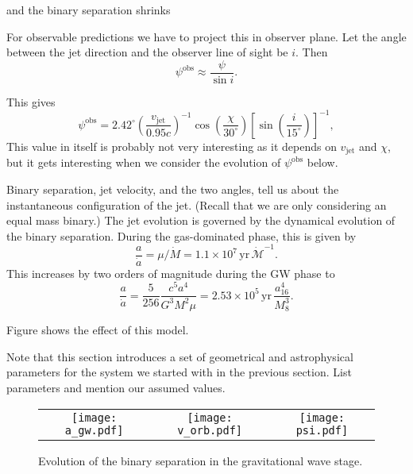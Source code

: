 and
the binary separation shrinks 

For observable predictions we have to project this in observer plane.
Let the angle between the jet direction and the observer line of sight
be $i$.  Then
\begin{equation}
  \psi^\mathrm{obs}\approx\frac{\psi}{\sin i}.
\end{equation}


This gives
\begin{equation}
  \psi^\mathrm{obs}=2.42^\circ \left(\frac{v_\mathrm{jet}}{0.95 c}\right)^{-1}\cos\left(\frac{\chi}{30^{\circ}}\right)\left[\sin\left(\frac{i}{15^{\circ}}\right)\right]^{-1},
\end{equation}
This value in itself is probably not very interesting as it depends on
$v_\mathrm{jet}$ and $\chi$, but it gets interesting when we consider
the evolution of $\psi^\mathrm{obs}$ below.

Binary separation, jet velocity, and the two angles, tell us about the
instantaneous configuration of the jet.  (Recall that we are only
considering an equal mass binary.)  The jet evolution is governed by
the dynamical evolution of the binary separation.  During the
gas-dominated phase, this is given by
\begin{equation}
\frac{a}{\dot a} = \mu/\dot M = 1.1\times 10^7\, \mathrm{yr}\,\dot{\mathcal{M}}^{-1}.   
\end{equation}
This increases by two orders of magnitude during the GW phase to
\begin{equation}
\frac{a}{\dot a} = \frac{5}{256}\frac{c^5a^4}{G^3M^2\mu}=2.53\times 10^5\,\mathrm{yr}\,\frac{a_{16}^4}{M_8^3}.
\end{equation}

Figure shows the effect of this model.

Note that this section introduces a set of geometrical and
astrophysical parameters for the system we started with in the
previous section.  List parameters and mention our assumed values.

\begin{figure*}
\begin{center}
  \begin{tabular}{ccc}
    \texttt{[image: a\_gw.pdf]} &
    \texttt{[image: v\_orb.pdf]} &
    \texttt{[image: psi.pdf]}
  \end{tabular}
\end{center}
\caption{Evolution of the binary separation in the gravitational wave stage.}
\label{fig:a_gw}
\end{figure*}

